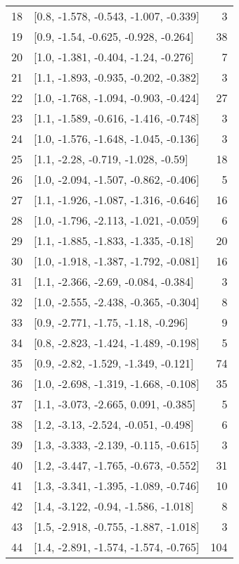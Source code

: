 \documentclass{article}%
\begin{document}
\begin{longtable}{llr}
18  &  [0.8, -1.578, -0.543, -1.007, -0.339] &       3 \\
19  &   [0.9, -1.54, -0.625, -0.928, -0.264] &      38 \\
20  &   [1.0, -1.381, -0.404, -1.24, -0.276] &       7 \\
21  &  [1.1, -1.893, -0.935, -0.202, -0.382] &       3 \\
22  &  [1.0, -1.768, -1.094, -0.903, -0.424] &      27 \\
23  &  [1.1, -1.589, -0.616, -1.416, -0.748] &       3 \\
24  &  [1.0, -1.576, -1.648, -1.045, -0.136] &       3 \\
25  &    [1.1, -2.28, -0.719, -1.028, -0.59] &      18 \\
26  &  [1.0, -2.094, -1.507, -0.862, -0.406] &       5 \\
27  &  [1.1, -1.926, -1.087, -1.316, -0.646] &      16 \\
28  &  [1.0, -1.796, -2.113, -1.021, -0.059] &       6 \\
29  &   [1.1, -1.885, -1.833, -1.335, -0.18] &      20 \\
30  &  [1.0, -1.918, -1.387, -1.792, -0.081] &      16 \\
31  &   [1.1, -2.366, -2.69, -0.084, -0.384] &       3 \\
32  &  [1.0, -2.555, -2.438, -0.365, -0.304] &       8 \\
33  &    [0.9, -2.771, -1.75, -1.18, -0.296] &       9 \\
34  &  [0.8, -2.823, -1.424, -1.489, -0.198] &       5 \\
35  &   [0.9, -2.82, -1.529, -1.349, -0.121] &      74 \\
36  &  [1.0, -2.698, -1.319, -1.668, -0.108] &      35 \\
37  &   [1.1, -3.073, -2.665, 0.091, -0.385] &       5 \\
38  &   [1.2, -3.13, -2.524, -0.051, -0.498] &       6 \\
39  &  [1.3, -3.333, -2.139, -0.115, -0.615] &       3 \\
40  &  [1.2, -3.447, -1.765, -0.673, -0.552] &      31 \\
41  &  [1.3, -3.341, -1.395, -1.089, -0.746] &      10 \\
42  &   [1.4, -3.122, -0.94, -1.586, -1.018] &       8 \\
43  &  [1.5, -2.918, -0.755, -1.887, -1.018] &       3 \\
44  &  [1.4, -2.891, -1.574, -1.574, -0.765] &     104 \\

\end{longtable}
\end{document}
